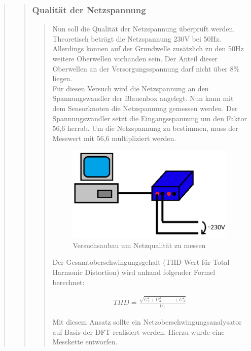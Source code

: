 \begin{quote}
\begin{quote}
		\subsubsection{Qualität der Netzspannung}
		\begin{quote}
            Nun soll die Qualität der Netzspannung überprüft werden. Theoretisch beträgt die Netzspannung 230V bei 50Hz.
            Allerdings können auf der Grundwelle zusätzlich zu den 50Hz weitere Oberwellen vorhanden sein. Der Anteil
            dieser Oberwellen an der Versorgungsspannung darf nicht über $8\%$ liegen.\\
            Für diesen Versuch wird die Netzspannung an den Spannungswandler der Blauenbox angelegt. Nun kann mit dem
            Sensorknoten die Netzspannung gemessen werden. Der Spannungswandler setzt die Eingangsspannung um den Faktor
            56,6 herrab. Um die Netzspannung zu bestimmen, muss der Messwert mit 56,6 multipliziert werden.
		
    		\begin{figure}[htb]
        		\centering
        		\includegraphics[scale=0.6, trim = 0cm 0cm 0cm 0cm,
                    clip]{./Bilder/Versuchsaufbau2}
        		\caption{Versuchsaubau um Netzqualität zu messen}
    		\end{figure}
		
		Der Gesamtoberschwingungsgehalt (THD-Wert für Total Harmonic Distortion) wird
		anhand folgender Formel berechnet:
		
		\begin{align}
		THD = \frac{\sqrt{U_2^2 + U_3^2 + \cdot \cdot \cdot + U_N^2}}{U_1}
		\end{align} 
		
		Mit diesem Ansatz sollte ein Netzoberschwingungsanalysator auf Basis der DFT
		realisiert werden. Hierzu wurde eine Messkette entworfen.
		

\end{quote}
\end{quote}
\end{quote}
